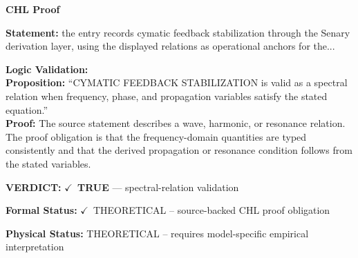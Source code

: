 \vspace{0.45em}
\noindent\textbf{CHL Proof}\par
\textbf{Statement:} the entry records cymatic feedback stabilization through the Senary derivation layer,
using the displayed relations as operational anchors for the...

\textbf{Logic Validation:}\\
\textbf{Proposition:} ``CYMATIC FEEDBACK STABILIZATION is valid as a spectral relation when frequency, phase,
and propagation variables satisfy the stated equation.''\\
\textbf{Proof:} The source statement describes a wave, harmonic, or resonance relation. The proof
obligation is that the frequency-domain quantities are typed consistently and that the
derived propagation or resonance condition follows from the stated variables.

\textbf{VERDICT:} \ensuremath{\checkmark}\ \textbf{TRUE} --- spectral-relation validation

\textbf{Formal Status:} \ensuremath{\checkmark}\ THEORETICAL -- source-backed CHL proof obligation

\textbf{Physical Status:} THEORETICAL -- requires model-specific empirical interpretation
\par\vspace{0.45em}
\par
\ifTZPDarkEdition
{}
\fi
\endgroup
\endgroup
